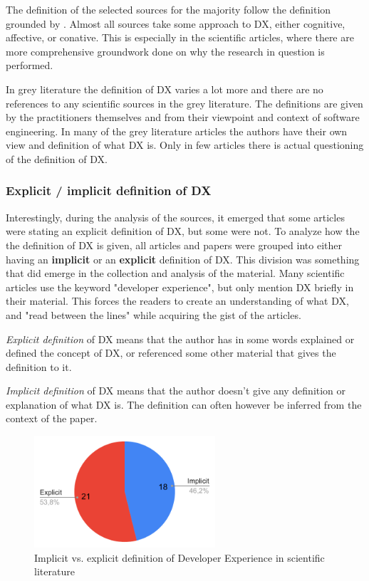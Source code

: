 \documentclass[english, 12pt, a4paper, sci, utf8, a-1b, online]{aaltothesis}
\begin{document}
The definition of the selected sources for the majority follow the definition grounded by \cite{fagerholm-doctoral-thesis}. Almost all sources take some approach to DX, either cognitive, affective, or conative. This is especially in the scientific articles, where there are more comprehensive groundwork done on why the research in question is performed.

In grey literature the definition of DX varies a lot more and there are no references to any scientific sources in the grey literature. The definitions are given by the practitioners themselves and from their viewpoint and context of software engineering. In many of the grey literature articles the authors have their own view and definition of what DX is. Only in few articles there is actual questioning of the definition of DX.

\subsubsection{Explicit / implicit definition of DX}

Interestingly, during the analysis of the sources, it emerged that some articles were stating an explicit definition of DX, but some were not. To analyze how the the definition of DX is given, all articles and papers were grouped into either having an \textbf{implicit} or an \textbf{explicit} definition of DX. This division was something that did emerge in the collection and analysis of the material. Many scientific articles use the keyword "developer experience", but only mention DX briefly in their material. This forces the readers to create an understanding of what DX, and "read between the lines" while acquiring the gist of the articles.

\textit{Explicit definition} of DX means that the author has in some words explained or defined the concept of DX, or referenced some other material that gives the definition to it.

\textit{Implicit definition} of DX means that the author doesn't give any definition or explanation of what DX is. The definition can often however be inferred from the context of the paper.

\begin{figure}[ht]
  \captionsetup{width=0.6\textwidth}
  \caption{Implicit vs. explicit definition of Developer Experience in scientific literature}
  \begin{center}
    \includegraphics[width=0.6\textwidth]{definition-scientific.pdf}
  \end{center}
\end{figure}
\end{document}
